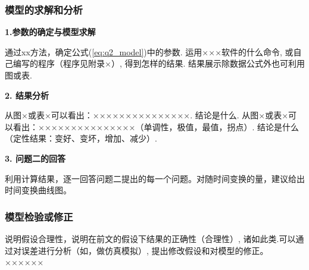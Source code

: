 \subsubsection{模型的求解和分析}
    \textbf{1.参数的确定与模型求解}
    
    通过xx方法，确定公式(\ref{eq:q2_model})中的参数. 运用×××软件的什么命令, 或自己编写的程序（程序见附录×）, 得到怎样的结果. 结果展示除数据公式外也可利用图或表. 
    
    \textbf{2. 结果分析}
    
    从图×或表×可以看出：×××××××××××××××. 结论是什么.
    从图×或表×可以看出：×××××××××××××××（单调性，极值，最值，拐点）. 结论是什么（定性结果：变好、变坏，增加、减少）.
    
    \textbf{3. 问题二的回答}
    
    利用计算结果，逐一回答问题二提出的每一个问题。对随时间变换的量，建议给出时间变换曲线图。

\subsubsection{模型检验或修正}
说明假设合理性，说明在前文的假设下结果的正确性（合理性）, 诸如此类.可以通过对误差进行分析（如，做仿真模拟）, 提出修改假设和对模型的修正。
××××××
